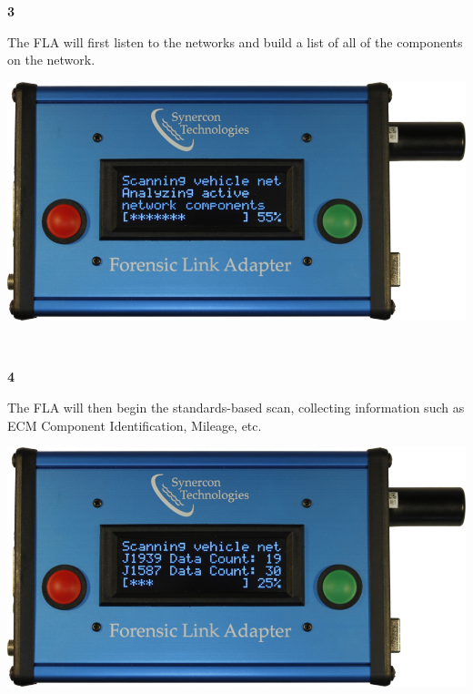\documentclass[11pt, oneside]{book}
\begin{document}
\noindent\begin{minipage}{0.45\textwidth}%
\begin{center}
\textbf{3}\\[\baselineskip]
\end{center}
The FLA will first listen to the
networks and build a list of all
of the components on the network.
\end{minipage}%
\hfill%
\begin{minipage}{0.45\textwidth}
\includegraphics[width=\linewidth]{../media/fla_screens/ethernet_and_others/veh_scan/analyzing_55}
\end{minipage}
\\[\baselineskip]
\noindent\begin{minipage}{0.45\textwidth}%
\begin{center}
\textbf{4}\\[\baselineskip]
\end{center}
The FLA will then begin the standards-based scan, collecting information such as ECM Component Identification, Mileage, etc.
\end{minipage}%
\hfill%
\begin{minipage}{0.45\textwidth}
\includegraphics[width=\linewidth]{../media/fla_screens/ethernet_and_others/veh_scan/scan_25}
\end{minipage}
\end{document}
